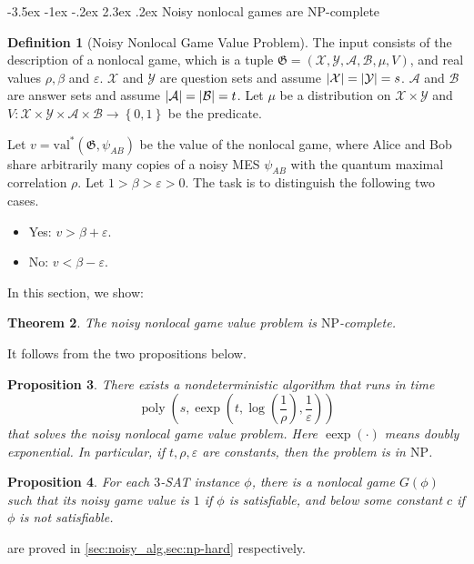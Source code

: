 \documentclass[10pt,a4paper]{article}
\makeatletter
\renewcommand{\section}{\@startsection {section}{1}{\z@}%
             {-3.5ex \@plus -1ex \@minus -.2ex}%
             {2.3ex \@plus .2ex}%
             {\normalfont\Large\scshape\bfseries}}
\theoremstyle{plain}
\newtheorem{theorem}{Theorem}[section]
\newtheorem{prop}[theorem]{Proposition}
\theoremstyle{definition}
\newtheorem{definition}[theorem]{Definition}
\newcommand {\set} [1] {\ensuremath{ \left\lbrace #1 \right\rbrace }}
\newcommand {\br} [1] {\ensuremath{ \left( #1 \right) }}
\DeclarePairedDelimiter{\abs}{\lvert}{\rvert}
\newcommand{\poly} {\ensuremath{\operatorname{poly}}}
\newcommand{\ep} {\ensuremath{\varepsilon}}
\newcommand{\calX}{\mathcal{X}}
\newcommand{\calY}{\mathcal{Y}}
\newcommand{\calA}{\mathcal{A}}
\newcommand{\calB}{\mathcal{B}}
\newcommand{\1}{\mathbb{1}} %
\newcommand{\val}{\mathrm{val}}
\newcommand{\NP}{\mathrm{NP}}
\makeatother
\begin{document}
%
\section{Noisy nonlocal games are NP-complete}

\begin{definition}[Noisy Nonlocal Game Value Problem]\label{def:nonlocalgameproblem}
The input consists of the description of a nonlocal game,
which is a tuple $\mathfrak{G}=\br{\calX, \calY, \calA, \calB, \mu, V}$,
and real values $\rho, \beta$ and $\ep$.
$\calX$ and $\calY$ are question sets and assume $\abs{\calX} = \abs{\calY} = s$.
$\calA$ and $\calB$ are answer sets and assume $\abs{\calA} = \abs{\calB} = t$.
Let $\mu$ be a distribution on $\calX\times\calY$ and $V: \calX\times\calY\times\calA\times\calB\to\set{0,1}$ be the predicate.

Let $v=\val^\ast(\mathfrak{G}, \psi_{AB})$ be the value of the nonlocal game,
where Alice and Bob share arbitrarily many copies of a noisy MES $\psi_{AB}$ with the quantum maximal correlation $\rho$.
Let $1>\beta> \ep>0$. The task is to distinguish the following two cases.
\begin{itemize}
    \item Yes: $v>\beta+\ep$.
    \item No: $v<\beta-\ep$.
\end{itemize}
\end{definition}
In this section, we show: 

\begin{theorem}
    The noisy nonlocal game value problem is $\NP$-complete.
\end{theorem}

It follows from the two propositions below.

\begin{prop}\label{thm:nonlocal-game-is-NP}
  There exists a nondeterministic algorithm that runs in time
  $$\poly\br{s, \operatorname{eexp}\br{t, \log\br{\frac{1}{\rho}}, \frac{1}{\ep}}}$$
  that solves the noisy nonlocal game value problem.
  Here $\operatorname{eexp}(\cdot)$ means doubly exponential.
  In particular, if $t, \rho, \ep$ are constants, then the problem is in $\mathrm{NP}$.
\end{prop}
\begin{prop}
    \label{prop:noisy-np-hard}
    For each $3$-SAT instance $\phi$, there is a nonlocal game $G(\phi)$ such that
    its noisy game value is $1$ if $\phi$ is satisfiable, and below some constant $c$ if
    $\phi$ is not satisfiable.
\end{prop}
 are proved in \cref{sec:noisy_alg,sec:np-hard} respectively.
\end{document}
